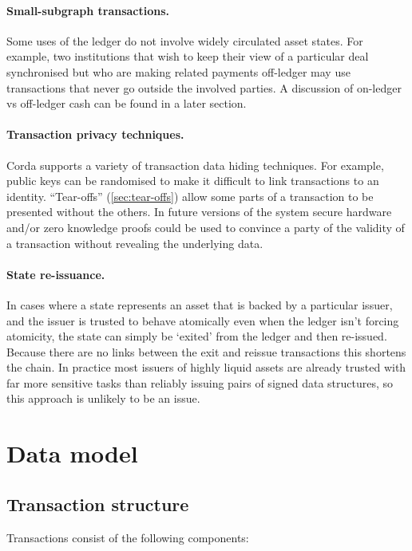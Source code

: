 \documentclass{article}
\begin{document}
\paragraph{Small-subgraph transactions.}Some uses of the ledger do not involve widely circulated asset states.
For example, two institutions that wish to keep their view of a particular deal synchronised but who are making
related payments off-ledger may use transactions that never go outside the involved parties. A discussion of
on-ledger vs off-ledger cash can be found in a later section.

\paragraph{Transaction privacy techniques.}Corda supports a variety of transaction data hiding techniques. For
example, public keys can be randomised to make it difficult to link transactions to an identity. ``Tear-offs'' (\cref{sec:tear-offs})
allow some parts of a transaction to be presented without the others. In future versions of the system secure hardware
and/or zero knowledge proofs could be used to convince a party of the validity of a transaction without revealing the
underlying data.

\paragraph{State re-issuance.}In cases where a state represents an asset that is backed by a particular issuer,
and the issuer is trusted to behave atomically even when the ledger isn't forcing atomicity, the state can
simply be `exited' from the ledger and then re-issued. Because there are no links between the exit and reissue
transactions this shortens the chain. In practice most issuers of highly liquid assets are already trusted with
far more sensitive tasks than reliably issuing pairs of signed data structures, so this approach is unlikely to
be an issue.

\section{Data model}

\subsection{Transaction structure}

Transactions consist of the following components:
\end{document}
